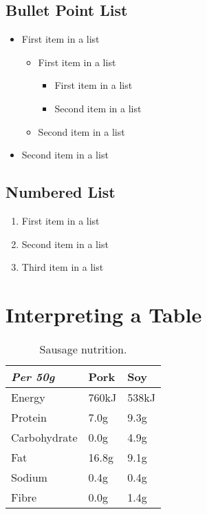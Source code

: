 \documentclass[11pt]{scrartcl} %
\begin{document}
\subsection{Bullet Point List}

\begin{itemize}
	\item First item in a list 
		\begin{itemize}
		\item First item in a list 
			\begin{itemize}
			\item First item in a list 
			\item Second item in a list 
			\end{itemize}
		\item Second item in a list 
		\end{itemize}
	\item Second item in a list 
\end{itemize}


\subsection{Numbered List}

\begin{enumerate}
	\item First item in a list 
	\item Second item in a list 
	\item Third item in a list
\end{enumerate}


\section{Interpreting a Table}

\begin{table}[h] %
	\centering %
	\begin{tabular}{l l l}
		\toprule
		\textit{Per 50g} & \textbf{Pork} & \textbf{Soy} \\
		\midrule
		Energy & 760kJ & 538kJ\\
		Protein & 7.0g & 9.3g\\
		Carbohydrate & 0.0g & 4.9g\\
		Fat & 16.8g & 9.1g\\
		Sodium & 0.4g & 0.4g\\
		Fibre & 0.0g & 1.4g\\
		\bottomrule
	\end{tabular}
	\caption{Sausage nutrition.}
\end{table}
\end{document}
